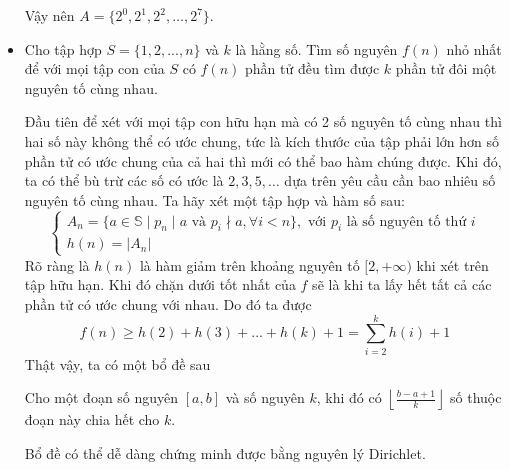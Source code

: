 \documentclass[11pt]{scrartcl}
\begin{document}
\begin{itemize}[label=, leftmargin=0em, itemsep=0.5em]
\begin{sol}
        Vậy nên  $A = \{2^0,2^1,2^2,\dots,2^7\}$.
    \end{sol}
    \item \begin{bt}
        Cho tập hợp $S = \{1,2,...,n\}$ và $k$ là hằng số. Tìm số nguyên $f(n)$ nhỏ nhất để với mọi tập con của $S$ có $f(n)$ phần tử đều tìm được $k$ phần tử đôi một nguyên tố cùng nhau.
    \end{bt}
    \begin{sol} Đầu tiên để xét với mọi tập con hữu hạn mà có 2 số nguyên tố cùng nhau thì hai số này không thể có ước chung, tức là kích thước của tập phải lớn hơn số phần tử có ước chung của cả hai thì mới có thể bao hàm chúng được. Khi đó, ta có thể bù trừ các số có ước là $2,3,5,\dots$ dựa trên yêu cầu cần bao nhiêu số nguyên tố cùng nhau.
        Ta hãy xét một tập hợp và hàm số sau:
        \[
            \left\{
            \begin{array}{l}
                A_n = \{a \in \mathbb{S} \mid p_n \mid a \text{ và } p_{i} \nmid a, \forall i < n\}, \text{ với } p_i \text{ là số nguyên tố thứ } i\\
                h(n) = |A_n|
            \end{array}
            \right.
        \]
        Rõ ràng là $h(n)$ là hàm giảm trên khoảng nguyên tố $[2,+\infty)$ khi xét trên tập hữu hạn. Khi đó chặn dưới tốt nhất của $f$ sẽ là khi ta lấy hết tất cả các phần tử có ước chung với nhau. Do đó ta được
        \[
            f(n) \geq  h(2) + h(3) + ... + h(k) + 1 = \sum_{i = 2}^k h(i) + 1
        \]
        Thật vậy, ta có một bổ đề sau

        
        \begin{lemma} Cho một đoạn số nguyên $[a,b]$ và số nguyên $k$, khi đó có $\left\lfloor\frac{b - a + 1}{k}\right\rfloor$ số thuộc đoạn này chia hết cho $k$.
        \end{lemma}
        Bổ đề có thể dễ dàng chứng minh được bằng nguyên lý Dirichlet.




\end{sol}
\end{itemize}
\end{document}
